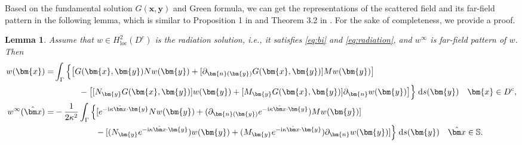 \documentclass[10pt,a4paper]{article}
\numberwithin{equation}{section}
\newtheorem{lemma}[theorem]{Lemma}
\begin{document}
Based on the fundamental solution $G(\bm{ x },\bm{ y })$ and Green formula, we can get the representations of the scattered field and its far-field pattern in the following lemma, which is similar to Proposition 1 in \cite{bourgeois_linear_2020} and Theorem 3.2 in \cite{dong_uniqueness_2024}. For the sake of completeness, we provide a proof.
\begin{lemma}
  \label{lem:rep}
  Assume that $w\in H^2_{\mathrm{loc}}(D^{c})$ is the radiation solution, i.e., it satisfies \eqref{eq:bi}
  and \eqref{eq:radiation}, and $w^{\infty}$ is far-field pattern of $w$. Then
  \begin{align}
   \notag
    w(\bm{x})  =&
                \int_{\Gamma}\Big\{
                  \big[ G(\bm{x},\bm{y}) N w(\bm{y})
                  + [\partial_{\bm{n}(\bm{y})}G(\bm{x},\bm{y})] M w(\bm{y}) \big]\\
    \label{eq:Green-rep}
              &\qquad\quad  - \big[ [N_{\bm{y}} G(\bm{x},\bm{y})]    w(\bm{y})
                    + [M_{\bm{y}} G(\bm{x},\bm{y})]   \partial_{\bm{n}} w(\bm{y}) \big]
                \Big\} \;\mathrm{d}s(\bm{y}) \quad \bm{x}\in D^{c},  \\   \notag
    w^{\infty}(\hat{\bm x}) = & -\frac{1}{2\kappa^{2}}
                \int_{\Gamma}\Big\{
                  [  e^{-\mathrm{i}\kappa\hat{\bm x}\cdot \bm{y}}N w(\bm{y})
                           + (\partial_{\bm{n}(\bm{y})}e^{-\mathrm{i}\kappa\hat{\bm x}\cdot \bm{y}})  M w(\bm{y}) ] \\
    \label{eq:far-rep}
             & \qquad\qquad\quad   - [ (N_{\bm{y}}e^{-\mathrm{i}\kappa\hat{\bm x}\cdot \bm{y}})    w(\bm{y})
                    + (M_{\bm{y}}e^{-\mathrm{i}\kappa\hat{\bm x}\cdot \bm{y}})  \partial_{\bm{n}} w(\bm{y}) ]
                \Big\} \;\mathrm{d}s(\bm{y}) \quad \hat{\bm x}\in \mathbb{S}.
  \end{align}
\end{lemma}
\end{document}
